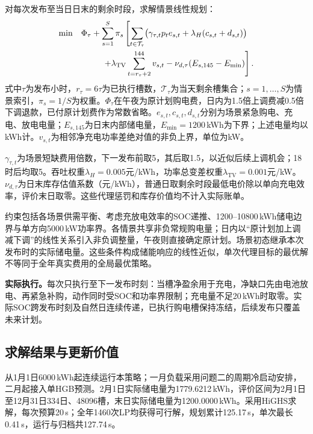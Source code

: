 对每次发布至当日日末的剩余时段，求解情景线性规划：
\begin{equation}\label{eq:q3-objective}
 \begin{aligned}
 \min\quad &\Phi_\tau+\sum_{s=1}^{S}\pi_s\left[
 \sum_{t\in\mathcal T_\tau}\bigl(\gamma_{\tau,t}p_te_{s,t}
 +\lambda_H(c_{s,t}+d_{s,t})\bigr)\right.\\
 &\left.\hspace{2.5em}+\lambda_{\mathrm{TV}}\sum_{t=r_\tau+2}^{144}v_{s,t}
 -\nu_{d,\tau}(E_{s,145}-E_{\min})\right].
 \end{aligned}
\end{equation}
式中$\tau$为发布小时，$r_\tau=6\tau$为已执行槽数，$\mathcal T_\tau$为当天剩余槽集合；$s=1,\ldots,S$为情景索引，$\pi_s=1/S$为权重。$\Phi_\tau$在午夜为原计划购电费，日内为1.5倍上调费减0.5倍下调退款，已付原计划费作为常数省略。$e_{s,t},c_{s,t},d_{s,t}$分别为场景紧急购电、充电、放电电量；$E_{s,145}$为日末内部储电量，$E_{\min}=1200$\,kWh为下界；上述电量均以kWh计。$v_{s,t}$为相邻净充电功率差绝对值的非负上界，单位为kW。

$\gamma_{\tau,t}$为场景短缺费用倍数，下一发布前取5，其后取1.5，以近似后续上调机会；18时后均取5。吞吐权重$\lambda_H=0.005$元/kWh，功率总变差权重$\lambda_{\mathrm{TV}}=0.001$元/kW。$\nu_{d,\tau}$为日末库存估值系数（元/kWh），普通日取剩余时段最低电价除以单向充电效率，评价末日取零。这些代理惩罚和库存价值均不计入实际账单。

约束包括各场景供需平衡、考虑充放电效率的SOC递推、1200--10800\,kWh储电边界与单方向5000\,kW功率界。各情景共享非负常规购电量；日内以“原计划加上调减下调”的线性关系引入非负调整量，午夜则直接确定原计划。场景初态继承本次发布时的实际储电量。这些条件构成储能响应的线性近似，单次代理目标的最优解不等同于全年真实费用的全局最优策略。

\textbf{实际执行。}每次只执行至下一发布时刻：当槽净盈余用于充电，净缺口先由电池放电、再紧急补购，动作同时受SOC和功率界限制；充电量不足20\,kWh时取零。实际SOC跨发布时刻及自然日连续传递，已执行购电槽保持冻结，后续发布只覆盖未来计划。

\subsection{求解结果与更新价值}

从1月1日6000\,kWh起连续运行本策略；一月负载采用问题二的周期冷启动安排，二月起接入单HGB预测。2月1日实际储电量为1779.6212\,kWh，评价区间为2月1日至12月31日334日、48096槽，末日实际储电量为1200.0000\,kWh。采用HiGHS求解，每次预算20\,s；全年1460次LP均获得可行解，规划累计125.17\,s，单次最长0.41\,s，运行与归档共127.74\,s。

